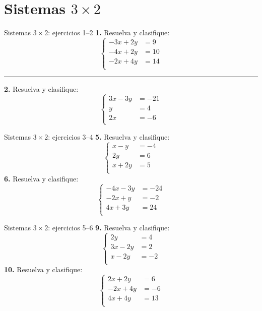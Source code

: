 \documentclass[aspectratio=169,9pt]{beamer}
\theoremstyle{remark}
\begin{document}
\section{Sistemas $3\times 2$}
\begin{frame}{Sistemas $3\times 2$: ejercicios 1--2}
\small
\textbf{1.} Resuelva y clasifique:
\[\left\{\begin{aligned}
-3x+2y&=9\\
-4x+2y&=10\\
-2x+4y&=14\\
\end{aligned}\right.\]
\vspace{0.2em}\hrule\vspace{0.3em}
\textbf{2.} Resuelva y clasifique:
\[\left\{\begin{aligned}
3x-3y&=-21\\
y&=4\\
2x&=-6\\
\end{aligned}\right.\]
\end{frame}
\begin{frame}{Sistemas $3\times 2$: ejercicios 3--4}
\small
\textbf{5.} Resuelva y clasifique:
\[\left\{\begin{aligned}
x-y&=-4\\
2y&=6\\
x+2y&=5\\
\end{aligned}\right.\]
\textbf{6.} Resuelva y clasifique:
\[\left\{\begin{aligned}
-4x-3y&=-24\\
-2x+y&=-2\\
4x+3y&=24\\
\end{aligned}\right.\]
\end{frame}
\begin{frame}{Sistemas $3\times 2$: ejercicios 5--6}
\small
\textbf{9.} Resuelva y clasifique:
\[\left\{\begin{aligned}
2y&=4\\
3x-2y&=2\\
x-2y&=-2\\
\end{aligned}\right.\]
\textbf{10.} Resuelva y clasifique:
\[\left\{\begin{aligned}
2x+2y&=6\\
-2x+4y&=-6\\
4x+4y&=13\\
\end{aligned}\right.\]
\end{frame}
\end{document}
